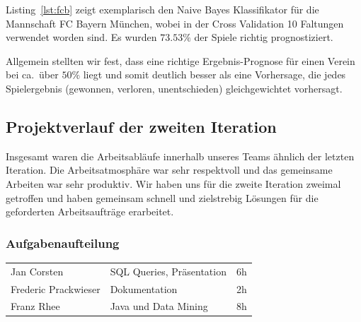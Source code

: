 \documentclass[
10pt,
a4paper
]{scrartcl}
\begin{document}
Listing~\ref{lst:fcb} zeigt exemplarisch den Naive Bayes Klassifikator für die Mannschaft FC Bayern München, wobei in der Cross Validation 10 Faltungen verwendet worden sind. 
Es wurden $73.53\%$ der Spiele richtig prognostiziert.



Allgemein stellten wir fest, dass eine richtige Ergebnis-Prognose für einen Verein bei ca.~über $50\%$ liegt und somit deutlich besser als eine Vorhersage, die jedes Spielergebnis (gewonnen, verloren, unentschieden) gleichgewichtet vorhersagt.


\subsection{Projektverlauf der zweiten Iteration}

Insgesamt waren die Arbeitsabläufe innerhalb unseres Teams ähnlich der letzten Iteration. Die Arbeitsatmosphäre war sehr respektvoll und das gemeinsame Arbeiten war sehr produktiv. Wir haben uns für die zweite Iteration zweimal getroffen und haben gemeinsam schnell und zielstrebig Lösungen für die geforderten Arbeitsaufträge erarbeitet.
 

\subsubsection{Aufgabenaufteilung}
\begin{tabular}{ l l c }
Jan Corsten & SQL Queries, Präsentation & 6h \\
Frederic Prackwieser & Dokumentation & 2h \\
Franz Rhee & Java und Data Mining & 8h \\
\end{tabular}
\end{document}
